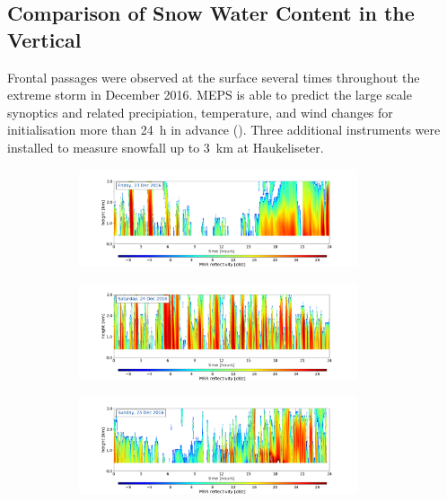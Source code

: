 \subsection{Comparison of Snow Water Content in the Vertical}
\label{sec:res:large_scale_vert}
Frontal passages were observed at the surface several times throughout the extreme storm in December 2016. MEPS is able to predict the large scale synoptics and related precipiation, temperature, and wind changes for initialisation more than \SI{24}{\hour} in advance (). Three additional instruments were installed %
to measure snowfall up to \SI{3}{\km} at Haukeliseter. 
\begin{figure}[H]
	\centering
	\begin{subfigure}[t]{\textwidth}
		\centering
		\includegraphics[trim={4.cm 2.5cm 4.5cm 1.5cm},clip,width=0.9\textwidth]{./fig_MRR_refl/MRR_20161223}
		\caption{}\label{fig:ret:refl23}
	\end{subfigure}
	\begin{subfigure}[t]{\textwidth}
		\centering
		\includegraphics[trim={4.cm 2.5cm 4.5cm 1.5cm},clip,width=0.9\textwidth]{./fig_MRR_refl/MRR_20161224}
		\caption{}\label{fig:ret:refl24}
	\end{subfigure}
	\begin{subfigure}[t]{\textwidth}
		\centering
		\includegraphics[trim={4.cm 2.5cm 4.5cm 1.5cm},clip,width=0.9\textwidth]{./fig_MRR_refl/MRR_20161225}

\end{subfigure}
\end{figure}
